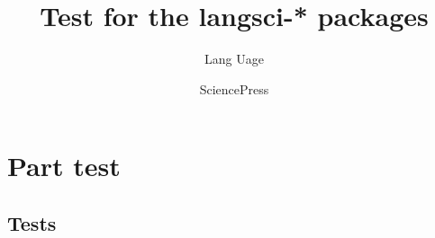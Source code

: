 \documentclass[output=book
  ,nonflat
  ,modfonts,
  ,colorlinks
  ,undecapitalize 
  ,collection
  ,showindex
  ,draftmode
  ,openreview
  ,nobabel
  ,booklanguage=french
  ,oldstylenumbers
  ]{langsci/langscibook}
\title{Test for the langsci-* packages}
\author{Lang Uage\and Science\lastand Press}
\begin{document}
\maketitle 
\tableofcontents
\mainmatter

\part{Part test}
\chapter{Tests} 
% 
% 
% 
% 
% 
% 
% 
% 
% 
% 
%  
% 
% 
% 
% 
% 
%  
% 
% 
%  
% 
%  
% 
\end{document}
